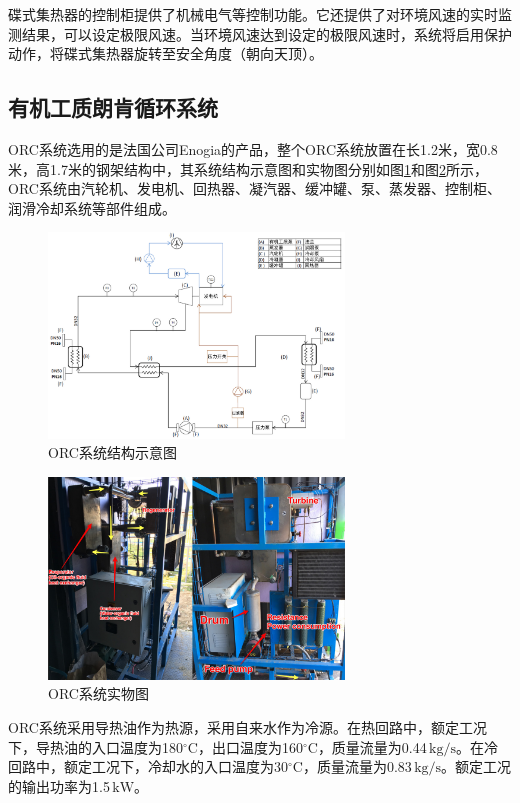 碟式集热器的控制柜提供了机械电气等控制功能。它还提供了对环境风速的实时监测结果，可以设定极限风速。当环境风速达到设定的极限风速时，系统将启用保护动作，将碟式集热器旋转至安全角度（朝向天顶）。

\subsection{有机工质朗肯循环系统}
ORC系统选用的是法国公司Enogia的产品，整个ORC系统放置在长1.2米，宽0.8米，高1.7米的钢架结构中，其系统结构示意图和实物图分别如图\ref{fig:ORCsystemScheme}和图\ref{fig:ORCsystem}所示，ORC系统由汽轮机、发电机、回热器、凝汽器、缓冲罐、泵、蒸发器、控制柜、润滑冷却系统等部件组成。
\begin{figure}[!ht]
\centering
\includegraphics[width=0.7\textwidth]{fig/ORCsystemScheme.jpg}
\caption{ORC系统结构示意图}
\label{fig:ORCsystemScheme}
\end{figure}
\begin{figure}[!ht]
\centering
\includegraphics[width=0.7\textwidth]{fig/ORCsystem.jpg}
\caption{ORC系统实物图}
\label{fig:ORCsystem}
\end{figure}

ORC系统采用导热油作为热源，采用自来水作为冷源。在热回路中，额定工况下，导热油的入口温度为180$\mathrm{^\circ C}$，出口温度为160$\mathrm{^\circ C}$，质量流量为0.44$\,\mathrm{kg/s}$。在冷回路中，额定工况下，冷却水的入口温度为30$\mathrm{^\circ C}$，质量流量为0.83$\,\mathrm{kg/s}$。额定工况的输出功率为1.5$\,\mathrm{kW}$。

